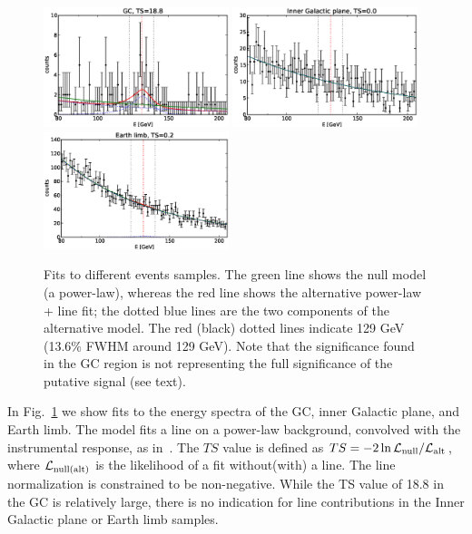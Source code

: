 \documentclass[aps,twocolumn,prd,superscriptaddress,showpacs,nofootinbib,fixfloat]{revtex4}
\begin{document}
\begin{figure}
  \centering
  \includegraphics[width=0.48\textwidth]{plots/counts_GC.eps}
  \includegraphics[width=0.48\textwidth]{plots/counts_IGP.eps}
  \includegraphics[width=0.48\textwidth]{plots/counts_limb.eps}
  \caption{Fits to different events samples. The green line
  shows the null model (a power-law), whereas the red line
  shows the alternative power-law + line fit; the dotted
  blue lines are the two components of the alternative
  model. The red (black) dotted lines indicate 129 GeV
  (13.6\% FWHM around 129 GeV). 
  Note that the significance found in the GC region is not representing
  the full significance of the putative signal (see text).}
  \label{fig:spectra1}
\end{figure}

In Fig.~\ref{fig:spectra1} we show fits to the energy
spectra of the GC, inner Galactic plane, and Earth limb.  The model fits a
line on a power-law background, convolved with the instrumental response, as
in~\cite{Weniger:2012}. The $TS$ value
is defined as $TS=-2\ln \mathcal{L}_{\rm
null}/\mathcal{L}_{\rm alt}$, where $\mathcal{L}_{\rm
null(alt)}$ is the likelihood of a fit without(with) a line.  The line
normalization is constrained to be non-negative. While the TS value of 18.8 in
the GC is relatively large, there is no indication for line contributions in
the Inner Galactic plane or Earth limb samples.
\end{document}
